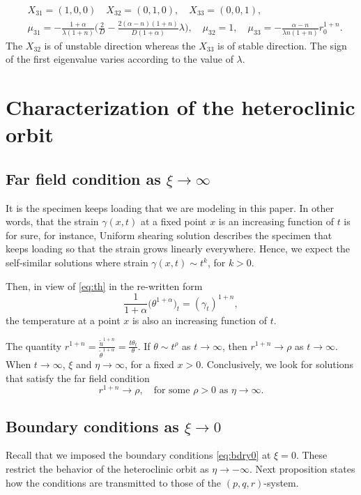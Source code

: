 \documentclass[a4paper,11pt]{article}
\def\tth{{\tilde{\theta}}}
\def\tu{{\tilde{u}}}
\begin{document}
\begin{align*}
 &X_{31} = (1,0,0) \quad X_{32}=(0,1,0), \quad X_{33}=(0,0,1),\\
 &\mu_{31} =-\frac{1+\alpha}{\lambda(1+n)} \Big(\frac{2}{D} - \frac{2(\alpha-n)(1+n)}{D(1+\alpha)}\lambda\Big), \quad \mu_{32}=1, \quad \mu_{33} = -\frac{\alpha-n}{\lambda n(1+n)}r_0^{1+n}.
\end{align*}
The $X_{32}$ is of unstable direction whereas the $X_{33}$ is of stable direction. The sign of the first eigenvalue varies according to the value of $\lambda$.

\section{Characterization of the heteroclinic orbit}

\subsection{Far field condition as $\xi \rightarrow \infty$} \label{sec:far}
It is the specimen keeps loading that we are modeling in this paper. In other words, that the strain $\gamma(x,t)$ at a fixed point $x$ is an increasing function of $t$ is for sure, for instance, Uniform shearing solution describes the specimen that keeps loading so that the strain grows linearly everywhere. Hence, we expect the self-similar solutions where strain $\gamma(x,t) \sim t^k$, for $k>0$.

Then, in view of \eqref{eq:th} in the re-written form
$$ \frac{1}{1+\alpha} \big(\theta^{1+\alpha}\big)_t = (\gamma_t)^{1+n}, $$
the temperature at a point $x$ is also an increasing function of $t$.

The quantity $\displaystyle r^{1+n} = \frac{\tu^{1+n}}{\tth^{1+\alpha}} = \frac{t\theta_t}{\theta}$. If $\theta \sim t^\rho$ as $t \rightarrow \infty$, then $r^{1+n} \rightarrow \rho$ as $t \rightarrow \infty$. When $t \rightarrow \infty$, $\xi$ and $\eta \rightarrow \infty$, for a fixed $x>0$. Conclusively, we look for solutions that satisfy the far field condition
\begin{equation}
    r^{1+n} \rightarrow \rho, \quad \text{for some $\rho>0$ as $\eta \rightarrow \infty$}. \label{eq:farcond}
\end{equation}

\subsection{Boundary conditions as $\xi \rightarrow 0$}
Recall that we imposed the boundary conditions \eqref{eq:bdry0} at $\xi=0$. These restrict the behavior of the heteroclinic orbit as $\eta \rightarrow -\infty$. Next proposition states how the conditions are transmitted to those of the $(p,q,r)$-system.
\end{document}
